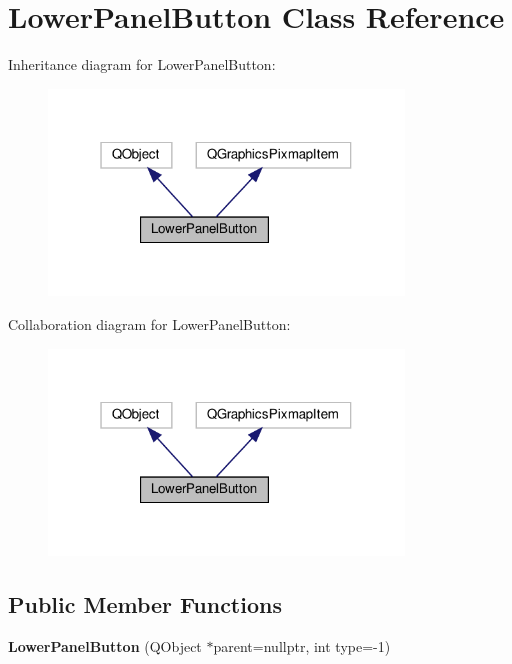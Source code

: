 \hypertarget{classLowerPanelButton}{}\section{Lower\+Panel\+Button Class Reference}
\label{classLowerPanelButton}


Inheritance diagram for Lower\+Panel\+Button\+:
\nopagebreak
\begin{figure}[H]
\begin{center}
\leavevmode
\includegraphics[width=268pt]{classLowerPanelButton__inherit__graph}
\end{center}
\end{figure}


Collaboration diagram for Lower\+Panel\+Button\+:
\nopagebreak
\begin{figure}[H]
\begin{center}
\leavevmode
\includegraphics[width=268pt]{classLowerPanelButton__coll__graph}
\end{center}
\end{figure}
\subsection*{Public Member Functions}
\begin{DoxyCompactItemize}
\item 
\mbox{\label{classLowerPanelButton_a01afac4f246ea833155b478fc374aba9}} 
{\bfseries Lower\+Panel\+Button} (Q\+Object $\ast$parent=nullptr, int type=-\/1)
\end{DoxyCompactItemize}

